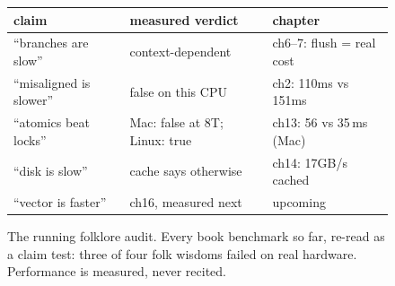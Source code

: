 \begin{figure}[htbp]
\centering
\begin{tabular}{lll}
\toprule
claim & measured verdict & chapter \\
\midrule
``branches are slow'' & context-dependent & ch6--7: flush = real cost \\
``misaligned is slower'' & false on this CPU & ch2: 110ms vs 151ms \\
``atomics beat locks'' & Mac: false at 8T; Linux: true & ch13: 56 vs 35\,ms (Mac) \\
``disk is slow'' & cache says otherwise & ch14: 17GB/s cached \\
``vector is faster'' & ch16, measured next & upcoming \\
\bottomrule
\end{tabular}
\caption{The running folklore audit. Every book benchmark so far,
re-read as a claim test: three of four folk wisdoms failed on real
hardware. Performance is measured, never recited.}
\label{fig:audit15}
\end{figure}
